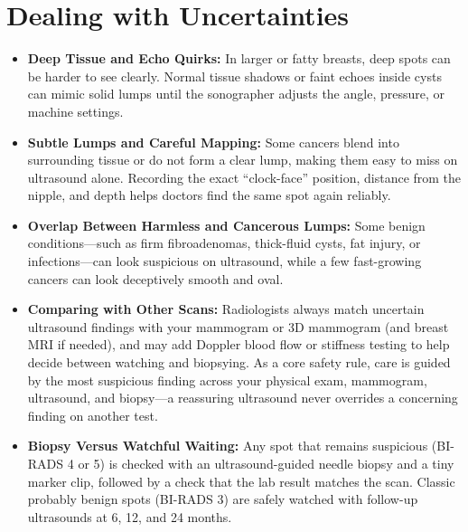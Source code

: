 \section{Dealing with Uncertainties}
\begin{itemize}
\item \textbf{Deep Tissue and Echo Quirks:} In larger or fatty breasts, deep spots can be harder to see clearly. Normal tissue shadows or faint echoes inside cysts can mimic solid lumps until the sonographer adjusts the angle, pressure, or machine settings.
\item \textbf{Subtle Lumps and Careful Mapping:} Some cancers blend into surrounding tissue or do not form a clear lump, making them easy to miss on ultrasound alone. Recording the exact ``clock-face'' position, distance from the nipple, and depth helps doctors find the same spot again reliably.
\item \textbf{Overlap Between Harmless and Cancerous Lumps:} Some benign conditions---such as firm fibroadenomas, thick-fluid cysts, fat injury, or infections---can look suspicious on ultrasound, while a few fast-growing cancers can look deceptively smooth and oval.
\item \textbf{Comparing with Other Scans:} Radiologists always match uncertain ultrasound findings with your mammogram or 3D mammogram (and breast MRI if needed), and may add Doppler blood flow or stiffness testing to help decide between watching and biopsying. As a core safety rule, care is guided by the most suspicious finding across your physical exam, mammogram, ultrasound, and biopsy---a reassuring ultrasound never overrides a concerning finding on another test.
\item \textbf{Biopsy Versus Watchful Waiting:} Any spot that remains suspicious (BI-RADS 4 or 5) is checked with an ultrasound-guided needle biopsy and a tiny marker clip, followed by a check that the lab result matches the scan. Classic probably benign spots (BI-RADS 3) are safely watched with follow-up ultrasounds at 6, 12, and 24 months.
\end{itemize}

